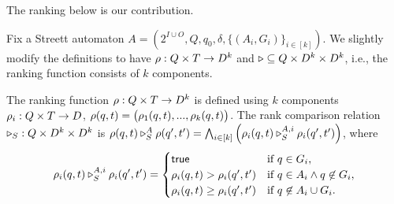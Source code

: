The ranking below is our contribution.

Fix a Streett automaton
$A = (2^{I\cup O}, Q, q_0, \delta, \{(A_i,G_i)\}_{i \in [k]})$.
We slightly modify the definitions to have
$\rho: Q\times T \to D^k$ and 
$\triangleright \subseteq Q \times D^k \times D^k$,
i.e.,
the ranking function consists of $k$ components.

The ranking function $\rho: Q \times T \to D^k$
is defined using $k$ components
$\rho_i: Q \times T \to D$,
$\rho(q,t) = \big(\rho_1(q,t),...,\rho_k(q,t)\big)$.
The rank comparison relation $\triangleright_S: Q \times D^k \times D^k$ is
$\rho(q,t) \triangleright_S^A \rho(q',t') = \bigwedge_{i \in [k]} \left(\rho_i(q,t) \triangleright_S^{A,i} \rho_i(q',t')\right)$,
where
\begin{equation}\label{eq:streett-ranking}
\rho_i(q,t) \triangleright_S^{A,i} \rho_i(q',t') =
\begin{cases}
  \textsf{true}                            &\text{if } q \in G_i,\\
  \rho_i(q,t)>\rho_i(q',t')      &\text{if } q \in A_i \land q \not\in G_i,\\
  \rho_i(q,t)\geq\rho_i(q',t')   &\text{if } q \not\in A_i \cup G_i.
\end{cases}
\end{equation}

